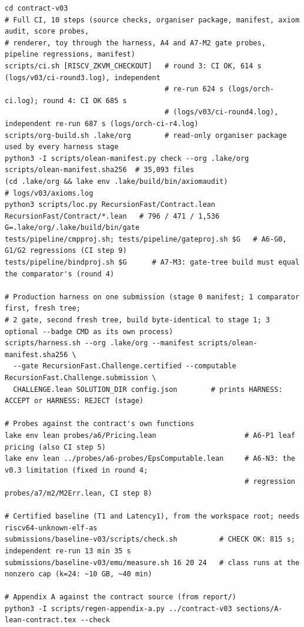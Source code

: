 \begin{Verbatim}[fontsize=\scriptsize,frame=single,framerule=0.3pt,rulecolor=\color{black!30},framesep=4pt]
cd contract-v03
# Full CI, 10 steps (source checks, organiser package, manifest, axiom audit, score probes,
# renderer, toy through the harness, A4 and A7-M2 gate probes, pipeline regressions, manifest)
scripts/ci.sh [RISCV_ZKVM_CHECKOUT]   # round 3: CI OK, 614 s (logs/v03/ci-round3.log), independent
                                      # re-run 624 s (logs/orch-ci.log); round 4: CI OK 685 s
                                      # (logs/v03/ci-round4.log), independent re-run 687 s (logs/orch-ci-r4.log)
scripts/org-build.sh .lake/org        # read-only organiser package used by every harness stage
python3 -I scripts/olean-manifest.py check --org .lake/org scripts/olean-manifest.sha256  # 35,093 files
(cd .lake/org && lake env .lake/build/bin/axiomaudit)                  # logs/v03/axioms.log
python3 scripts/loc.py RecursionFast/Contract.lean RecursionFast/Contract/*.lean   # 796 / 471 / 1,536
G=.lake/org/.lake/build/bin/gate
tests/pipeline/cmpproj.sh; tests/pipeline/gateproj.sh $G   # A6-G0, G1/G2 regressions (CI step 9)
tests/pipeline/bindproj.sh $G      # A7-M3: gate-tree build must equal the comparator's (round 4)

# Production harness on one submission (stage 0 manifest; 1 comparator first, fresh tree;
# 2 gate, second fresh tree, build byte-identical to stage 1; 3 optional --badge CMD as its own process)
scripts/harness.sh --org .lake/org --manifest scripts/olean-manifest.sha256 \
  --gate RecursionFast.Challenge.certified --computable RecursionFast.Challenge.submission \
  CHALLENGE.lean SOLUTION_DIR config.json        # prints HARNESS: ACCEPT or HARNESS: REJECT (stage)

# Probes against the contract's own functions
lake env lean probes/a6/Pricing.lean                     # A6-P1 leaf pricing (also CI step 5)
lake env lean ../probes/a6-probes/EpsComputable.lean     # A6-N3: the v0.3 limitation (fixed in round 4;
                                                         # regression probes/a7/m2/M2Err.lean, CI step 8)

# Certified baseline (T1 and Latency1), from the workspace root; needs riscv64-unknown-elf-as
submissions/baseline-v03/scripts/check.sh          # CHECK OK: 815 s; independent re-run 13 min 35 s
submissions/baseline-v03/emu/measure.sh 16 20 24   # class runs at the nonzero cap (k=24: ~10 GB, ~40 min)

# Appendix A against the contract source (from report/)
python3 -I scripts/regen-appendix-a.py ../contract-v03 sections/A-lean-contract.tex --check
\end{Verbatim}

